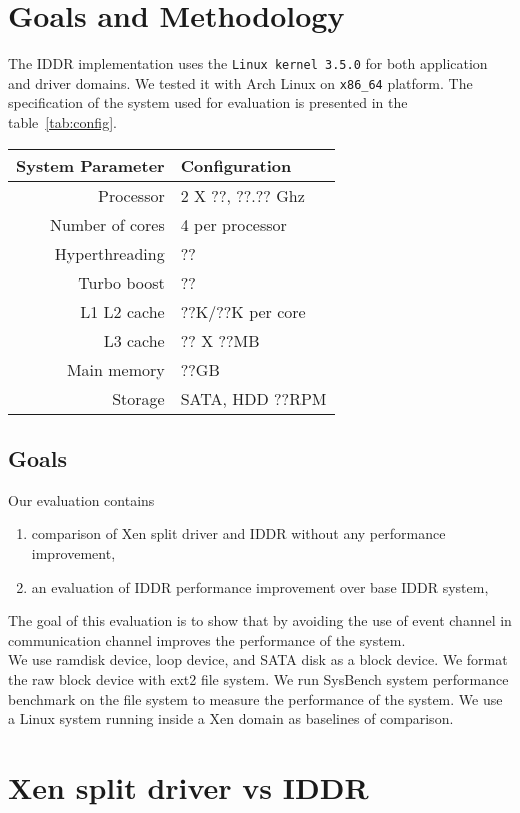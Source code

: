 \section{Goals and Methodology}
The IDDR implementation uses the \texttt{Linux kernel 3.5.0} for both application and driver domains. We tested it with Arch Linux on \texttt{x86\_64} platform. The specification of the system used for evaluation is presented in the table~\ref{tab:config}. 

\begin{center}
\begin{tabular}{|r|l|} 
  \hline
  \label{tab:config}
  System Parameter & Configuration \\
  \hline
  Processor & 2 X ??, ??.?? Ghz \\
  Number of cores & 4 per processor \\
  Hyperthreading & ?? \\
  Turbo boost & ?? \\
  L1 L2 cache & ??K/??K per core \\
  L3 cache & ?? X ??MB \\
  Main memory & ??GB \\
  Storage & SATA, HDD ??RPM \\
  \hline 
\end{tabular}
\end{center}
 
\subsection{Goals}
Our evaluation contains 
\begin{enumerate} 
\item comparison of Xen split driver and IDDR without any performance improvement, 
\item an evaluation of IDDR performance improvement over base IDDR system,
\end{enumerate}
The goal of this evaluation is to show that by avoiding the use of event channel in communication channel improves the performance of the system. 
\\
We use ramdisk device, loop device, and SATA disk as a block device. We format the raw block device with ext2 file system. We run SysBench system performance benchmark on the file system to measure the performance of the system. We use a Linux system running inside a Xen domain as baselines of comparison. 

\section{Xen split driver vs IDDR}

